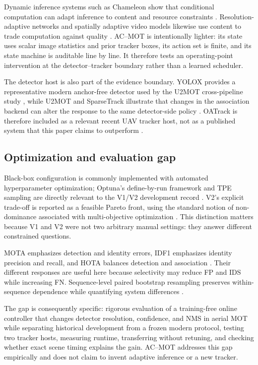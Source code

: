 Dynamic inference systems such as Chameleon show that conditional computation
can adapt inference to content and resource constraints
\cite{jiang2018chameleon}. Resolution-adaptive networks and spatially adaptive
video models likewise use content to trade computation against quality
\cite{yang2020ranet}. AC--MOT is intentionally lighter: its
state uses scalar image statistics and prior tracker boxes, its action set is
finite, and its state machine is auditable line by line. It therefore tests an
operating-point intervention at the detector--tracker boundary rather than a
learned scheduler.

The detector host is also part of the evidence boundary. YOLOX provides a
representative modern anchor-free detector used by the U2MOT cross-pipeline
study \cite{ge2021yolox}, while U2MOT and SparseTrack illustrate that changes in
the association backend can alter the response to the same detector-side
policy \cite{liu2023u2mot,liu2025sparsetrack}. OATrack is therefore included as
a relevant recent UAV tracker host, not as a published system that this paper
claims to outperform \cite{qi2026oatrack}.

\subsection{Optimization and evaluation gap}
Black-box configuration is commonly implemented with automated hyperparameter
optimization; Optuna's define-by-run framework and TPE sampling are directly
relevant to the V1/V2 development record \cite{akiba2019optuna}. V2's explicit
trade-off is reported as a feasible Pareto front, using the standard notion of
non-dominance associated with multi-objective optimization \cite{deb2002nsga2}.
This distinction matters because V1 and V2 were not two arbitrary manual
settings: they answer different constrained questions.

MOTA emphasizes detection and identity errors, IDF1 emphasizes identity
precision and recall, and HOTA balances detection and association
\cite{luiten2021hota}. Their different responses are useful here because
selectivity may reduce FP and IDS while increasing FN. Sequence-level paired
bootstrap resampling preserves within-sequence dependence while quantifying
system differences \cite{efron1993bootstrap}.

The gap is consequently specific: rigorous evaluation of a training-free
online controller that changes detector resolution, confidence, and NMS in
aerial MOT while separating historical development from a frozen modern
protocol, testing two tracker hosts, measuring runtime, transferring without
retuning, and checking whether exact scene timing explains the gain. AC--MOT
addresses this gap empirically and does not claim to invent adaptive inference
or a new tracker.
